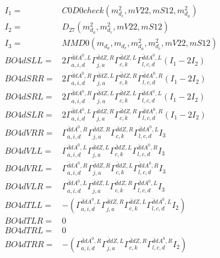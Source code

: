 \documentclass[A4,landscape]{article}
\begin{document}
\begin{align} 
I_1 = & C0D0check(m^2_{d_{{c}}}, mV22, mS12, m^2_{d_{{a}}}) \\ 
I_2 = & D_{27}(m^2_{d_{{a}}}, m^2_{d_{{c}}}, mV22, mS12) \\ 
I_3 = & MMD0(m_{d_{{a}}}, m_{d_{{c}}}, m^2_{d_{{a}}}, m^2_{d_{{c}}}, mV22, mS12) \\ 
  BO4dSLL= & 2  \Gamma^{\bar{d}d A^0 ,L}_{a, i, d} \Gamma^{\bar{d}d Z ,R}_{j, a} \Gamma^{\bar{d}d Z ,L}_{c, k} \Gamma^{\bar{d}d A^0 ,L}_{l, c, d} (I_1 - 2 I_2) \\ 
  BO4dSRR= & 2  \Gamma^{\bar{d}d A^0 ,R}_{a, i, d} \Gamma^{\bar{d}d Z ,L}_{j, a} \Gamma^{\bar{d}d Z ,R}_{c, k} \Gamma^{\bar{d}d A^0 ,R}_{l, c, d} (I_1 - 2 I_2) \\ 
  BO4dSRL= & 2  \Gamma^{\bar{d}d A^0 ,R}_{a, i, d} \Gamma^{\bar{d}d Z ,L}_{j, a} \Gamma^{\bar{d}d Z ,L}_{c, k} \Gamma^{\bar{d}d A^0 ,L}_{l, c, d} (I_1 - 2 I_2) \\ 
  BO4dSLR= & 2  \Gamma^{\bar{d}d A^0 ,L}_{a, i, d} \Gamma^{\bar{d}d Z ,R}_{j, a} \Gamma^{\bar{d}d Z ,R}_{c, k} \Gamma^{\bar{d}d A^0 ,R}_{l, c, d} (I_1 - 2 I_2) \\ 
  BO4dVRR= &  \Gamma^{\bar{d}d A^0 ,R}_{a, i, d} \Gamma^{\bar{d}d Z ,R}_{j, a} \Gamma^{\bar{d}d Z ,R}_{c, k} \Gamma^{\bar{d}d A^0 ,L}_{l, c, d} I_3 \\ 
  BO4dVLL= &  \Gamma^{\bar{d}d A^0 ,L}_{a, i, d} \Gamma^{\bar{d}d Z ,L}_{j, a} \Gamma^{\bar{d}d Z ,L}_{c, k} \Gamma^{\bar{d}d A^0 ,R}_{l, c, d} I_3 \\ 
  BO4dVRL= &  \Gamma^{\bar{d}d A^0 ,R}_{a, i, d} \Gamma^{\bar{d}d Z ,R}_{j, a} \Gamma^{\bar{d}d Z ,L}_{c, k} \Gamma^{\bar{d}d A^0 ,R}_{l, c, d} I_3 \\ 
  BO4dVLR= &  \Gamma^{\bar{d}d A^0 ,L}_{a, i, d} \Gamma^{\bar{d}d Z ,L}_{j, a} \Gamma^{\bar{d}d Z ,R}_{c, k} \Gamma^{\bar{d}d A^0 ,L}_{l, c, d} I_3 \\ 
  BO4dTLL= & -( \Gamma^{\bar{d}d A^0 ,L}_{a, i, d} \Gamma^{\bar{d}d Z ,R}_{j, a} \Gamma^{\bar{d}d Z ,L}_{c, k} \Gamma^{\bar{d}d A^0 ,L}_{l, c, d} I_2) \\ 
  BO4dTLR= & 0 \\ 
  BO4dTRL= & 0 \\ 
  BO4dTRR= & -( \Gamma^{\bar{d}d A^0 ,R}_{a, i, d} \Gamma^{\bar{d}d Z ,L}_{j, a} \Gamma^{\bar{d}d Z ,R}_{c, k} \Gamma^{\bar{d}d A^0 ,R}_{l, c, d} I_2) \\ 
\end{align} 
\end{document}
